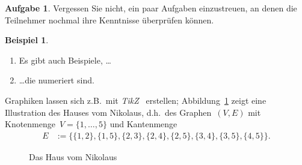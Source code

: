 \documentclass[a4paper,twoside,DIV8,10pt]{scrartcl}
\theoremstyle{definition}
\newtheorem{aufgabe}[satz]{Aufgabe}
\newtheorem{beispiel}[satz]{Beispiel}
\begin{document}
  \begin{aufgabe}
    Vergessen Sie nicht, ein paar Aufgaben einzustreuen, an denen die
    Teilnehmer nochmal ihre Kenntnisse \"uberpr\"ufen k\"onnen.
  \end{aufgabe}

  \begin{beispiel}
    \hfil
    \begin{enumerate}
      \item Es gibt auch Beispiele, \dots
      \item \dots die numeriert sind.
    \end{enumerate}
  \end{beispiel}

  Graphiken lassen sich z.B.\ mit \emph{TikZ}~\cite{tantau} erstellen;
  Abbildung~\ref{fig:hausvomnikolaus} zeigt eine Illustration des \glqq
  Hauses vom Nikolaus\grqq, d.h.\ des Graphen~$(V,E)$ mit Knotenmenge~$V
  = \{1,\dots,5\}$ und Kantenmenge
  \begin{align*}
    E & := \bigl\{ \{1,2\}
                 , \{1,5\}
                 , \{2,3\}
                 , \{2,4\}
                 , \{2,5\}
                 , \{3,4\}
                 , \{3,5\}
                 , \{4,5\}
           \bigr\}.
  \end{align*}

  \begin{figure}
    \begin{center}
    \end{center}
    \caption{Das Haus vom Nikolaus}
    \label{fig:hausvomnikolaus}
  \end{figure}
\end{document}
